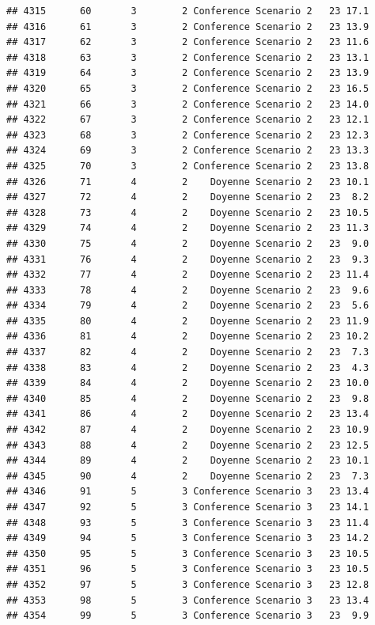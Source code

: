 \documentclass[
]{article}
\begin{document}
\begin{verbatim}
## 4315      60       3        2 Conference Scenario 2   23 17.1
## 4316      61       3        2 Conference Scenario 2   23 13.9
## 4317      62       3        2 Conference Scenario 2   23 11.6
## 4318      63       3        2 Conference Scenario 2   23 13.1
## 4319      64       3        2 Conference Scenario 2   23 13.9
## 4320      65       3        2 Conference Scenario 2   23 16.5
## 4321      66       3        2 Conference Scenario 2   23 14.0
## 4322      67       3        2 Conference Scenario 2   23 12.1
## 4323      68       3        2 Conference Scenario 2   23 12.3
## 4324      69       3        2 Conference Scenario 2   23 13.3
## 4325      70       3        2 Conference Scenario 2   23 13.8
## 4326      71       4        2    Doyenne Scenario 2   23 10.1
## 4327      72       4        2    Doyenne Scenario 2   23  8.2
## 4328      73       4        2    Doyenne Scenario 2   23 10.5
## 4329      74       4        2    Doyenne Scenario 2   23 11.3
## 4330      75       4        2    Doyenne Scenario 2   23  9.0
## 4331      76       4        2    Doyenne Scenario 2   23  9.3
## 4332      77       4        2    Doyenne Scenario 2   23 11.4
## 4333      78       4        2    Doyenne Scenario 2   23  9.6
## 4334      79       4        2    Doyenne Scenario 2   23  5.6
## 4335      80       4        2    Doyenne Scenario 2   23 11.9
## 4336      81       4        2    Doyenne Scenario 2   23 10.2
## 4337      82       4        2    Doyenne Scenario 2   23  7.3
## 4338      83       4        2    Doyenne Scenario 2   23  4.3
## 4339      84       4        2    Doyenne Scenario 2   23 10.0
## 4340      85       4        2    Doyenne Scenario 2   23  9.8
## 4341      86       4        2    Doyenne Scenario 2   23 13.4
## 4342      87       4        2    Doyenne Scenario 2   23 10.9
## 4343      88       4        2    Doyenne Scenario 2   23 12.5
## 4344      89       4        2    Doyenne Scenario 2   23 10.1
## 4345      90       4        2    Doyenne Scenario 2   23  7.3
## 4346      91       5        3 Conference Scenario 3   23 13.4
## 4347      92       5        3 Conference Scenario 3   23 14.1
## 4348      93       5        3 Conference Scenario 3   23 11.4
## 4349      94       5        3 Conference Scenario 3   23 14.2
## 4350      95       5        3 Conference Scenario 3   23 10.5
## 4351      96       5        3 Conference Scenario 3   23 10.5
## 4352      97       5        3 Conference Scenario 3   23 12.8
## 4353      98       5        3 Conference Scenario 3   23 13.4
## 4354      99       5        3 Conference Scenario 3   23  9.9

\end{verbatim}
\end{document}
